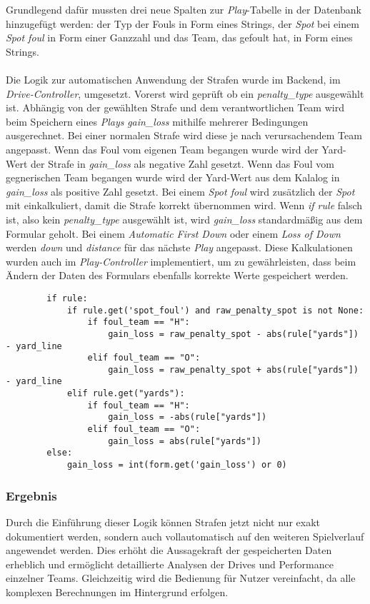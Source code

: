 \vspace*{0.3cm}
Grundlegend dafür mussten drei neue Spalten zur \textit{Play}-Tabelle in der Datenbank hinzugefügt werden: der Typ der Fouls in Form eines Strings, der \textit{Spot} bei einem \textit{Spot foul} in Form einer Ganzzahl und das Team, das gefoult hat, in Form eines Strings.
\\
\\
Die Logik zur automatischen Anwendung der Strafen wurde im Backend, im \textit{Drive-Controller}, umgesetzt. Vorerst wird geprüft ob ein \textit{penalty\_type} ausgewählt ist. Abhängig von der gewählten Strafe und dem verantwortlichen Team wird beim Speichern eines \textit{Plays} \textit{gain\_loss} mithilfe mehrerer Bedingungen ausgerechnet. Bei einer normalen Strafe wird diese je nach verursachendem Team angepasst. Wenn das Foul vom eigenen Team begangen wurde wird der Yard-Wert der Strafe in \textit{gain\_loss} als negative Zahl gesetzt. Wenn das Foul vom gegnerischen Team begangen wurde wird der Yard-Wert aus dem Kalalog in \textit{gain\_loss} als positive Zahl gesetzt. Bei einem \textit{Spot foul} wird zusätzlich der \textit{Spot} mit einkalkuliert, damit die Strafe korrekt übernommen wird. Wenn \textit{if rule} falsch ist, also kein \textit{penalty\_type} ausgewählt ist, wird \textit{gain\_loss} standardmäßig aus dem Formular geholt. Bei einem \textit{Automatic First Down} oder einem \textit{Loss of Down} werden \textit{down} und \textit{distance} für das nächste \textit{Play} angepasst. 
Diese Kalkulationen wurden auch im \textit{Play-Controller} implementiert, um zu gewährleisten, dass beim Ändern der Daten des Formulars ebenfalls korrekte Werte gespeichert werden.
\vspace*{0.3cm}
\begin{verbatim}
        if rule:
            if rule.get('spot_foul') and raw_penalty_spot is not None:
                if foul_team == "H":
                    gain_loss = raw_penalty_spot - abs(rule["yards"]) - yard_line
                elif foul_team == "O":
                    gain_loss = raw_penalty_spot + abs(rule["yards"]) - yard_line
            elif rule.get("yards"):
                if foul_team == "H":
                    gain_loss = -abs(rule["yards"])
                elif foul_team == "O":
                    gain_loss = abs(rule["yards"])
        else:
            gain_loss = int(form.get('gain_loss') or 0)
\end{verbatim}
\vspace*{0.3cm}
\subsubsection{Ergebnis}
\vspace*{0.5cm}
Durch die Einführung dieser Logik können Strafen jetzt nicht nur exakt dokumentiert werden, sondern auch vollautomatisch auf den weiteren Spielverlauf angewendet werden. Dies erhöht die Aussagekraft der gespeicherten Daten erheblich und ermöglicht detaillierte Analysen der Drives und Performance einzelner Teams. Gleichzeitig wird die Bedienung für Nutzer vereinfacht, da alle komplexen Berechnungen im Hintergrund erfolgen.

